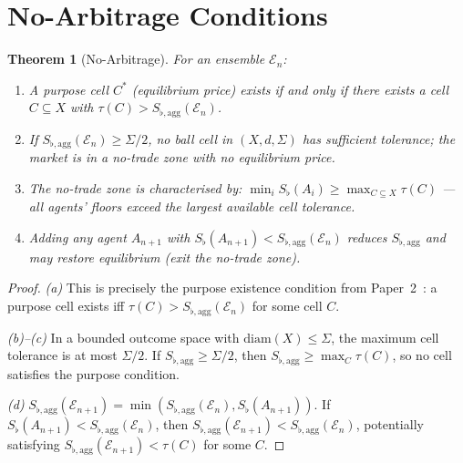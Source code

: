 \documentclass[twocolumn,11pt,a4paper]{article}
\newtheorem{theorem}{Theorem}[section]
\theoremstyle{remark}
\newcommand{\Sflat}{S_{\flat}}
\newcommand{\tol}{\tau}
\newcommand{\Ens}{\mathcal{E}}
\newcommand{\SflatT}{S_{\flat,\mathrm{agg}}}        %
\begin{document}
\section{No-Arbitrage Conditions}
\label{sec:no-arb}

\begin{theorem}[No-Arbitrage]
\label{thm:no-arb}
For an ensemble $\Ens_n$:
\begin{enumerate}[label=\textup{(\alph*)}]
\item A purpose cell $C^*$ (equilibrium price) exists if and only if there
  exists a cell $C \subseteq X$ with $\tol(C) > \SflatT(\Ens_n)$.
\item If $\SflatT(\Ens_n) \ge \Sigma/2$, no ball cell in $(X, d, \Sigma)$
  has sufficient tolerance; the market is in a \emph{no-trade zone} with
  no equilibrium price.
\item The no-trade zone is characterised by:
  $\min_i \Sflat(A_i) \ge \max_{C \subseteq X} \tol(C)$ — all agents'
  floors exceed the largest available cell tolerance.
\item Adding any agent $A_{n+1}$ with $\Sflat(A_{n+1}) < \SflatT(\Ens_n)$
  reduces $\SflatT$ and may restore equilibrium (exit the no-trade zone).
\end{enumerate}
\end{theorem}
\begin{proof}
\textit{(a)}  This is precisely the purpose existence condition from
Paper~2~\cite{sachikonye2025market}: a purpose cell exists iff $\tol(C) >
\SflatT(\Ens_n)$ for some cell $C$.

\textit{(b)--(c)}  In a bounded outcome space with $\mathrm{diam}(X) \le
\Sigma$, the maximum cell tolerance is at most $\Sigma/2$.  If $\SflatT
\ge \Sigma/2$, then $\SflatT \ge \max_C \tol(C)$, so no cell satisfies
the purpose condition.

\textit{(d)}  $\SflatT(\Ens_{n+1}) = \min(\SflatT(\Ens_n), \Sflat(A_{n+1}))$.
If $\Sflat(A_{n+1}) < \SflatT(\Ens_n)$, then $\SflatT(\Ens_{n+1}) <
\SflatT(\Ens_n)$, potentially satisfying $\SflatT(\Ens_{n+1}) < \tol(C)$
for some $C$.
\end{proof}
\end{document}
